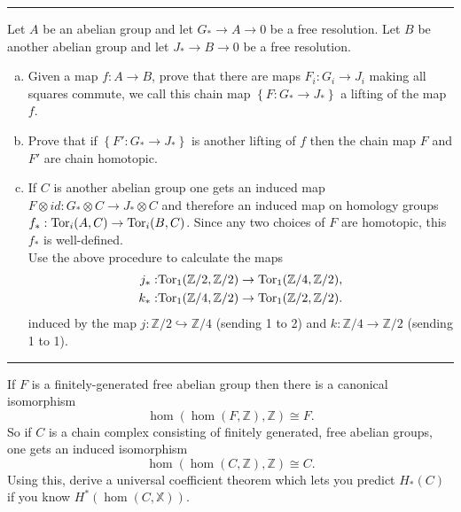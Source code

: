 \documentclass[a4paper, 12pt]{article}
\begin{document}
\noindent\rule{7in}{2.8pt}
\begin{problem}{2}
Let \(A\) be an abelian group and let \(G_*\rightarrow A\rightarrow 0\) be a free resolution. Let \(B\) be another abelian group and let \(J_*\rightarrow B\rightarrow 0\) be a free resolution. 
\begin{enumerate}[(a)]
\item Given a map \(f:A\rightarrow B\), prove that there are maps \(F_i:G_i\rightarrow J_i\) making all squares commute, we call this chain map \(\left\{ F:G_*\rightarrow J_* \right\}\) a lifting of the map \(f\). 
\item Prove that if \(\left\{ F':G_*\rightarrow J_* \right\}\) is another lifting of \(f\) then the chain map \(F\) and \(F'\) are chain homotopic. 
\item If \(C\) is another abelian group one gets an induced map \(F\otimes id:G_*\otimes C\rightarrow J_*\otimes C\) and therefore an induced map on homology groups \(f_*:\text{Tor}_i(A,C)\rightarrow \text{Tor}_i(B,C)\). Since 
any two choices of \(F\) are homotopic, this \(f_*\) is well-defined.\\ 
Use the above procedure to calculate the maps 
\begin{align*}
    j_*:&\text{Tor}_1(\mathbb{Z}/2,\mathbb{Z}/2)\rightarrow \text{Tor}_1(\mathbb{Z}/4,\mathbb{Z}/2),\\ 
    k_*:&\text{Tor}_1(\mathbb{Z}/4,\mathbb{Z}/2)\rightarrow \text{Tor}_1(\mathbb{Z}/2,\mathbb{Z}/2).
\end{align*}
induced by the map \(j:\mathbb{Z}/2\hookrightarrow \mathbb{Z}/4\) (sending 1 to 2) and \(k:\mathbb{Z}/4\rightarrow \mathbb{Z}/2\) (sending 1 to 1).
\end{enumerate}
\end{problem}
\begin{solution}
    
\end{solution}

\noindent\rule{7in}{2.8pt}
\begin{problem}{3.7}
If \(F\) is a finitely-generated free abelian group then there is a canonical isomorphism 
\[\hom(\hom(F,\mathbb{Z}),\mathbb{Z})\cong F.\]
So if \(C\) is a chain complex consisting of finitely generated, free abelian groups, one gets an induced isomorphism 
\[\hom(\hom(C,\mathbb{Z}),\mathbb{Z})\cong C.\]
Using this, derive a universal coefficient theorem which lets you predict \(H_*(C)\) if you know \(H^*(\hom(C,\mathbb{X}))\).
\end{problem}
\begin{solution}
    
\end{solution}
\end{document}
